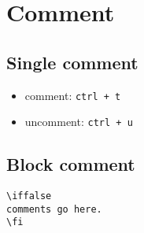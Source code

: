 
\chapter{Comment}

\section{Single comment}
\begin{itemize}
\item comment: \lstinline|ctrl + t|
\item uncomment: \lstinline |ctrl + u|
\end{itemize}

\section{Block comment}

\begin{lstlisting}
\iffalse
comments go here.
\fi
\end{lstlisting}